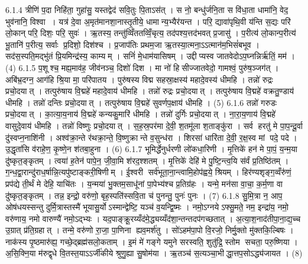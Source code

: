 6.1.4
त्रीणि॑ प॒दा निहि॑ता॒ गुहा॑सु॒ यस्तद्वेद॑ सवि॒तुः पि॒ताऽस॑त् । स नो॒ बन्धु॑र्जनि॒ता स वि॑धा॒ता धामा॑नि॒ वेद॒ भुव॑नानि॒ विश्वा । यत्र॑ दे॒वा अ॒मृत॑मानशा॒नास्तृ॒तीये॒ धामान्य॒भ्यैर॑यन्त । परि॒ द्यावा॑पृथि॒वी य॑न्ति स॒द्यः परि॑ लो॒कान् परि॒ दिशः॒ परि॒ सुवः॑ । ऋ॒तस्य॒ तन्तु॑व्विँततव्विँ॒चृत्य॒ तद॑पश्य॒त्तद॑भवत् प्र॒जासु॑ । प॒रीत्य॑ लो॒कान्प॒रीत्य॑ भू॒तानि॑ प॒रीत्य॒ सर्वाः प्र॒दिशो॒ दिश॑श्च । प्र॒जाप॑तिः प्रथम॒जा ऋ॒तस्या॒त्मना॒ऽऽत्मान॑म॒भिसं॑बभूव । सद॑स॒स्पति॒मद्भु॑तं प्रि॒यमिन्द्र॑स्य॒ काम्यम् । सनिं॑ मे॒धाम॑यासिषम् । उद्दीप्यस्व जातवेदोऽप॒घ्नन्निर्\mbox{}ऋ॑तिं॒ मम॑ । (4)
6.1.5
प॒शूश्च॒ मह्य॒माव॑ह॒ जीव॑नञ्च॒ दिशो॑ दिश । मा नो॑ हिसीज्जातवेदो॒ गामश्वं॒ पुरु॑ष॒ञ्जग॑त् । अबि॑भ्र॒दग्न॒ आग॑हि श्रि॒या मा॒ परि॑पातय । पुरु॑षस्य विद्म सहस्रा॒क्षस्य॑ महादे॒वस्य॑ धीमहि । तन्नो॑ रुद्रः प्रचो॒दयात् । तत्पुरु॑षाय वि॒द्महे॑ महादे॒वाय॑ धीमहि । तन्नो॑ रुद्रः प्रचो॒दयात् । तत्पुरु॑षाय वि॒द्महे॑ वक्रतु॒ण्डाय॑ धीमहि । तन्नो॑ दन्तिः प्रचो॒दयात् । तत्पुरु॑षाय वि॒द्महे॑ सुवर्णप॒क्षाय॑ धीमहि । (5)
6.1.6
तन्नो॑ गरुडः प्रचो॒दयात् । का॒त्या॒य॒नाय॑ वि॒द्महे॑ कन्यकु॒मारि॑ धीमहि । तन्नो॑ दुर्गिः प्रचो॒दयात् । ना॒रा॒य॒णाय॑ वि॒द्महे॑ वासुदे॒वाय॑ धीमहि । तन्नो॑ विष्णुः प्रचो॒दयात् । स॒ह॒स्र॒पर॑मा दे॒वी॒ श॒तमू॑ला श॒ताङ्कु॑रा । सर्व हरतु॑ मे पा॒प॒न्दू॒र्वा दु॑स्वप्न॒नाशि॑नी । अश्व॑क्रा॒न्ते र॑थक्रा॒न्ते॒ वि॒ष्णुक्रान्ते व॒सुन्ध॑रा । शिरसा॑ धारि॑ता दे॒वी॒ र॒क्ष॒स्व मां पदे॒ पदे । उ॒द्धृता॑सि व॑राहे॒ण॒ कृ॒ष्णे॒न श॑तबा॒हुना । (6)
6.1.7
भूमिर्द्धेनुर्धरणी लो॑कधा॒रिणी । मृ॒त्तिके॑ हन॑ मे पा॒पं॒ य॒न्म॒या दु॑ष्कृत॒ङ्कृतम् । त्वया॑ ह॒तेन॑ पापे॒न॒ जी॒वा॒मि श॑रद॒श्शतम् । मृ॒त्तिके॑ देहि॑ मे पु॒ष्टि॒न्त्व॒यि स॑र्वं प्र॒तिष्ठि॑तम् । ग॒न्ध॒द्वा॒रान्दु॑राध॒र्\mbox{}षान्नि॒त्यपु॑ष्टाङ्करी॒षिणीम् । ई॒श्वरी सर्व॑भूता॒ना॒न्त्वामि॒होप॑ह्वये॒ श्रियम् । हिर॑ण्यशृङ्ग॒व्वँरु॑णं॒ प्रप॑द्ये ती॒र्थं मे देहि॒ याचि॑तः । य॒न्मया॑ भु॒क्तम॒साधू॑नां पा॒पेभ्य॑श्च प्र॒तिग्र॑हः । यन्मे॒ मन॑सा वा॒चा॒ क॒र्म॒णा वा दु॑ष्कृत॒ङ्कृतम् । तन्न॒ इन्द्रो॒ वरु॑णो॒ बृह॒स्पति॑स्सवि॒ता च॑ पुनन्तु॒ पुनः॑ पुनः । (7)
6.1.8
सु॒मि॒त्रा न॒ आप॒ ओष॑धयस्सन्तु दुर्मि॒त्रास्तस्मै॑ भूयासु॒र्योऽस्मान्द्वेष्टि॒ यञ्च॑ व॒यन्द्वि॒ष्मः । नमो॒ऽग्नयेऽफ्सु॒मते॒ नम॒ इन्द्रा॑य॒ नमो॒ वरु॑णाय॒ नमो वारुण्यै॑ नमो॒ऽद्भ्यः । यद॒पाङ्क्रू॒रय्यँद॑मे॒द्ध्यय्यँद॑शा॒न्तन्तदप॑गच्छतात् । अ॒त्या॒श॒नाद॑तीपा॒ना॒द्य॒च्च उ॒ग्रात् प्र॑ति॒ग्रहात् । तन्मे॒ वरु॑णो रा॒जा॒ पा॒णिना ह्यव॒मर्\mbox{}श॑तु । सो॑ऽहम॑पा॒पो वि॒रजो॒ निर्मु॒क्तो मु॑क्तकि॒ल्बिषः । नाक॑स्य पृ॒ष्ठमारु॑ह्य॒ गच्छे॒द्ब्रह्म॑सलो॒कताम् । इ॒मं मे॑ गङ्गे यमुने सरस्वति॒ शुतु॑द्रि॒ स्तोम सचता॒ परु॒ष्णिया । अ॒सि॒क्नि॒या म॑रुद्वृधे वि॒तस्त॒याऽऽर्जी॑कीये श्रुणु॒ह्या सु॒षोम॑या । ऋ॒तञ्च॑ स॒त्यञ्चा॒भीद्धा॒त्तप॒सोऽद्ध्य॑जायत । (8)
